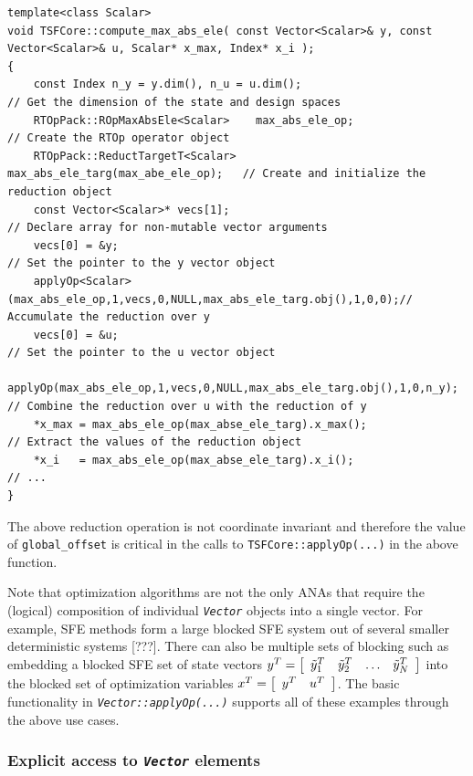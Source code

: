 \documentclass[10pt,fleqn]{article}
\begin{document}
{\scriptsize\begin{verbatim}
template<class Scalar>
void TSFCore::compute_max_abs_ele( const Vector<Scalar>& y, const Vector<Scalar>& u, Scalar* x_max, Index* x_i );
{
    const Index n_y = y.dim(), n_u = u.dim();                             // Get the dimension of the state and design spaces
    RTOpPack::ROpMaxAbsEle<Scalar>    max_abs_ele_op;                     // Create the RTOp operator object
    RTOpPack::ReductTargetT<Scalar>   max_abs_ele_targ(max_abe_ele_op);   // Create and initialize the reduction object
    const Vector<Scalar>* vecs[1];                                        // Declare array for non-mutable vector arguments
    vecs[0] = &y;                                                         // Set the pointer to the y vector object
    applyOp<Scalar>(max_abs_ele_op,1,vecs,0,NULL,max_abs_ele_targ.obj(),1,0,0);// Accumulate the reduction over y
    vecs[0] = &u;                                                         // Set the pointer to the u vector object
    applyOp(max_abs_ele_op,1,vecs,0,NULL,max_abs_ele_targ.obj(),1,0,n_y); // Combine the reduction over u with the reduction of y
    *x_max = max_abs_ele_op(max_abse_ele_targ).x_max();                   // Extract the values of the reduction object
    *x_i   = max_abs_ele_op(max_abse_ele_targ).x_i();                     // ...
}
\end{verbatim}}

The above reduction operation is not coordinate invariant and
therefore the value of \texttt{global\_offset} is critical in the
calls to \texttt{TSFCore\-::applyOp(...)} in the above function.

Note that optimization algorithms are not the only ANAs that require
the (logical) composition of individual \texttt{\textit{Vector}}
objects into a single vector.  For example, SFE methods form a large
blocked SFE system out of several smaller deterministic systems [???].
There can also be multiple sets of blocking such as embedding a
blocked SFE set of state vectors $y^T = \bmat{cccc} \tilde{y}_1^T &
\tilde{y}_2^T & \ldots & \tilde{y}_N^T \emat$ into the blocked set of
optimization variables $x^T = \bmat{cc} y^T & u^T \emat$.  The basic
functionality in \texttt{\textit{Vector\-::applyOp(...)}} supports all
of these examples through the above use cases.

%
\subsubsection{Explicit access to \texttt{\textit{Vector}} elements}
%
\end{document}
